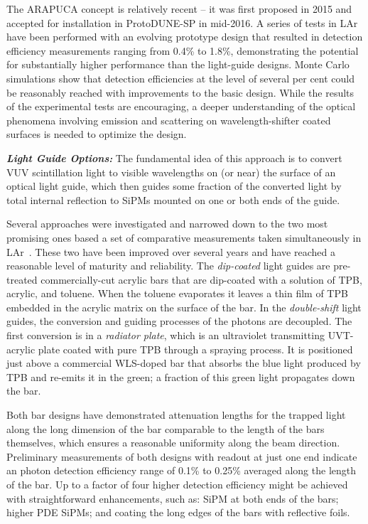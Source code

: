 The ARAPUCA concept is relatively recent -- it was first proposed in 2015 and accepted for installation in ProtoDUNE-SP in mid-2016. A series of tests in LAr have been performed with an evolving prototype design that resulted in detection efficiency measurements ranging from  \num{0.4}\% to \num{1.8}\%, demonstrating the potential for substantially higher performance than the light-guide designs. Monte Carlo simulations show that detection efficiencies at the level of several per cent could be reasonably reached with improvements to the basic design. 
While the results of the experimental tests are encouraging, a deeper understanding of the optical phenomena involving emission and scattering on wavelength-shifter coated surfaces is needed to optimize the design.

{\it\bf Light Guide Options:} The fundamental idea of this approach is to convert VUV scintillation light to visible wavelengths on (or near) the surface of an optical light guide, which then guides some fraction of the converted light by total internal reflection to SiPMs mounted on one or both ends of the guide.

Several approaches were investigated and narrowed down to the two most promising ones based a set of comparative measurements taken simultaneously in LAr~\cite{Whittington:2015rkr}. These two have been improved over several years and have reached a reasonable level of maturity and reliability.
The {\it dip-coated} light guides are pre-treated commercially-cut acrylic bars that are dip-coated with a solution of TPB, acrylic, and toluene. When the toluene evaporates it leaves a thin film of TPB embedded in the acrylic matrix on the surface of the bar.  In the {\it double-shift} light guides, the conversion and guiding processes of the photons are decoupled. The first conversion is in a {\it radiator plate}, which is an ultraviolet transmitting UVT-acrylic plate coated with pure TPB through a spraying process. It is positioned 
just above a commercial WLS-doped bar that absorbs the blue light produced by TPB and re-emits it in the green; a fraction of this green light propagates down the bar. 

Both bar designs have demonstrated attenuation lengths for the  trapped light along the long dimension of the bar comparable to the length of the bars themselves, which ensures a reasonable uniformity along the beam direction. Preliminary measurements of both designs with readout at just one end indicate an photon detection efficiency range of  \num{0.1}\% to \num{0.25}\% averaged along the length of the bar. 
Up to a factor of four higher detection efficiency might be achieved with straightforward enhancements, such as:  SiPM at both ends of the bars; higher PDE SiPMs; and coating the long edges of the bars with reflective foils. 

